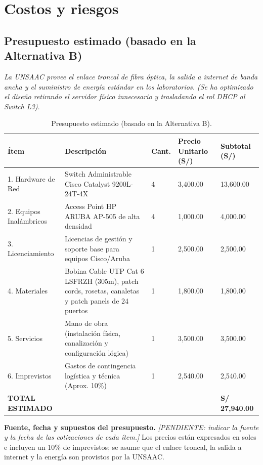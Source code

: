 \section{Costos y riesgos}

\subsection{Presupuesto estimado (basado en la Alternativa B)}

	\textit{La UNSAAC provee el enlace troncal de fibra óptica, la salida a internet de banda ancha y el suministro de energía estándar en los laboratorios. (Se ha optimizado el diseño retirando el servidor físico innecesario y trasladando el rol DHCP al Switch L3).}

	\begin{table}[H]
		\centering
		\caption{Presupuesto estimado (basado en la Alternativa B).}
		\begin{tabular}{T{2.2cm}T{5.3cm}C{1.2cm}C{2.3cm}C{2.3cm}}
			\hline
			\textbf{Ítem} & \textbf{Descripción} & \textbf{Cant.} & \textbf{Precio Unitario (S/)} & \textbf{Subtotal (S/)} \bigstrut\\
			. Hardware de Red & Switch Administrable Cisco Catalyst 9200L-24T-4X & 4 & 3,400.00 & 13,600.00 \\
			2. Equipos Inalámbricos & Access Point HP ARUBA AP-505 de alta densidad & 4 & 1,000.00 & 4,000.00 \\
			3. Licenciamiento & Licencias de gestión y soporte base para equipos Cisco/Aruba & 1 & 2,500.00 & 2,500.00 \\
			4. Materiales & Bobina Cable UTP Cat 6 LSFRZH (305m), patch cords, rosetas, canaletas y patch panels de 24 puertos & 1 & 1,800.00 & 1,800.00 \\
			5. Servicios & Mano de obra (instalación física, canalización y configuración lógica) & 1 & 3,500.00 & 3,500.00 \\
			6. Imprevistos & Gastos de contingencia logística y técnica (Aprox. 10\%) & 1 & 2,540.00 & 2,540.00 \\
			\hline
			\textbf{TOTAL ESTIMADO} & & & & \textbf{S/ 27,940.00} \bigstrut\\
			\hline
		\end{tabular}
		\label{tab:presupuesto}
	\end{table}

	\textbf{Fuente, fecha y supuestos del presupuesto.} \textit{[PENDIENTE: indicar la fuente y la fecha de las cotizaciones de cada ítem.]} Los precios están expresados en soles e incluyen un 10\% de imprevistos; se asume que el enlace troncal, la salida a internet y la energía son provistos por la UNSAAC.

